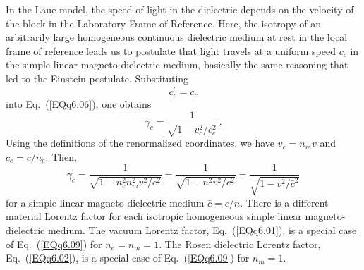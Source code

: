 \documentclass[twocolumn,amssymb,eqsecnum,aps,pra]{revtex4-2}
\begin{document}
\par
In the Laue model, the speed of light in the dielectric depends on the
velocity of the block in the Laboratory Frame of Reference.
Here, the isotropy of an arbitrarily large homogeneous continuous
dielectric medium at rest in the local frame of reference leads us to
postulate that light travels at a uniform speed $c_c$ in the simple
linear magneto-dielectric medium, basically the same reasoning that
led to the Einstein postulate.
Substituting
\begin{equation}
c_c^{\prime}=c_c
\label{EQq6.07}
\end{equation}
into Eq.~(\ref{EQq6.06}), one obtains
\begin{equation}
\gamma_c= \frac {1}{\sqrt{1- v_c^2/c_c^2}} \,.
\label{EQq6.08}
\end{equation}
Using the definitions of the renormalized coordinates, we have
$v_c=n_mv$ and $c_c=c/n_e$.
Then,
\begin{equation}
\gamma_c=\frac{1}{\sqrt{1- n_e^2n_m^2v^2/c^2}}
=\frac{1}{\sqrt{1- n^2v^2/c^2}}
=\frac{1}{\sqrt{1- v^2/\bar c^2}}
\label{EQq6.09}
\end{equation}
for a simple linear magneto-dielectric medium ${\bar c}=c/n$.
There is a different material Lorentz factor for each isotropic
homogeneous simple linear magneto-dielectric medium.
The vacuum Lorentz factor, Eq.~(\ref{EQq6.01}), is a special case of
Eq.~(\ref{EQq6.09}) for $n_e=n_m=1$.
The Rosen dielectric Lorentz factor, Eq.~(\ref{EQq6.02}), is a special
case of Eq.~(\ref{EQq6.09}) for $n_m=1$.
\par
\end{document}
